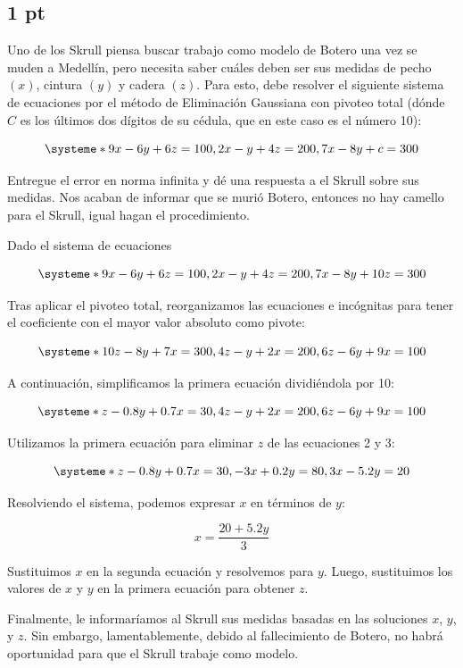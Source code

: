 \subsection{1 pt}

Uno de los Skrull piensa buscar trabajo como modelo de Botero una vez se muden a
Medellín, pero necesita saber cuáles deben ser sus medidas de pecho $(x)$,
cintura $(y)$ y cadera $(z)$. Para esto, debe resolver el siguiente sistema de
ecuaciones por el método de Eliminación Gaussiana con pivoteo total
(dónde $C$ es los últimos dos dígitos de su cédula, que en este caso es el número 10):

\[
    \systeme*{9x - 6y + 6z = 100, 2x - y + 4z= 200, 7x - 8y + c= 300}
\]

Entregue el error en norma infinita y dé una respuesta a el Skrull sobre sus
medidas. Nos acaban de informar que se murió Botero, entonces no hay camello
para el Skrull, igual hagan el procedimiento.


Dado el sistema de ecuaciones

\[
    \systeme*{
        9x - 6y + 6z = 100,
        2x - y + 4z = 200,
        7x - 8y + 10z = 300
    }
\]

Tras aplicar el pivoteo total, reorganizamos las ecuaciones e incógnitas para tener el coeficiente con el mayor valor absoluto como pivote:

\[
    \systeme*{
        10z - 8y + 7x = 300,
        4z - y + 2x = 200,
        6z - 6y + 9x = 100
    }
\]

A continuación, simplificamos la primera ecuación dividiéndola por 10:

\[
    \systeme*{
        z - 0.8y + 0.7x = 30,
        4z - y + 2x = 200,
        6z - 6y + 9x = 100
    }
\]

Utilizamos la primera ecuación para eliminar \(z\) de las ecuaciones 2 y 3:

\[
    \systeme*{
        z - 0.8y + 0.7x = 30,
        -3x + 0.2y = 80,
        3x - 5.2y = 20
    }
\]

Resolviendo el sistema, podemos expresar \(x\) en términos de \(y\):

\[
    x = \frac{20 + 5.2y}{3}
\]

Sustituimos \(x\) en la segunda ecuación y resolvemos para \(y\). Luego, sustituimos los valores de \(x\) y \(y\) en la primera ecuación para obtener \(z\).

Finalmente, le informaríamos al Skrull sus medidas basadas en las soluciones \(x\), \(y\), y \(z\). Sin embargo, lamentablemente, debido al fallecimiento de Botero, no habrá oportunidad para que el Skrull trabaje como modelo.

